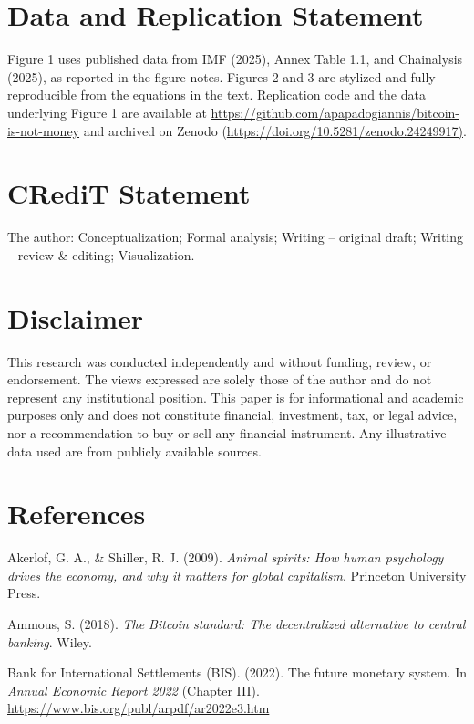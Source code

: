 \documentclass[12pt]{article}
\begin{document}
\section*{Data and Replication Statement}

Figure 1 uses published data from IMF (2025), Annex Table 1.1, and Chainalysis (2025), as reported in the figure notes. Figures 2 and 3 are stylized and fully reproducible from the equations in the text. Replication code and the data underlying Figure 1 are available at \url{https://github.com/apapadogiannis/bitcoin-is-not-money} and archived on Zenodo (\url{https://doi.org/10.5281/zenodo.24249917)}.

\section*{CRediT Statement}

The author: Conceptualization; Formal analysis; Writing -- original draft; Writing -- review \& editing; Visualization.

\section*{Disclaimer}

This research was conducted independently and without funding, review, or endorsement. The views expressed are solely those of the author and do not represent any institutional position. This paper is for informational and academic purposes only and does not constitute financial, investment, tax, or legal advice, nor a recommendation to buy or sell any financial instrument. Any illustrative data used are from publicly available sources.

\section*{References}
\begingroup
\small
\setlength{\parindent}{-1.5em}\setlength{\leftskip}{1.5em}\setlength{\parskip}{0.3em}\sloppy

Akerlof, G. A., \& Shiller, R. J. (2009). \emph{Animal spirits: How human psychology drives the economy, and why it matters for global capitalism}. Princeton University Press.

Ammous, S. (2018). \emph{The Bitcoin standard: The decentralized alternative to central banking}. Wiley.

Bank for International Settlements (BIS). (2022). The future monetary system. In \emph{Annual Economic Report 2022} (Chapter III). \url{https://www.bis.org/publ/arpdf/ar2022e3.htm}
\end{document}
